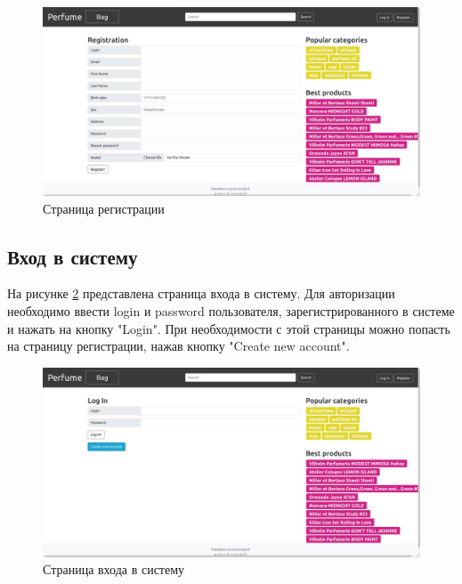 \captionsetup{singlelinecheck = false, justification=centering}
\begin{figure}[h!]
	\begin{center}
		\includegraphics[scale=0.45]{assets/site_reg.jpg}
	\end{center}
	\caption{Страница регистрации}
	\label{site_reg}
\end{figure}

\subsection{Вход в систему}

На рисунке \ref{site_login} представлена страница входа в систему. Для авторизации необходимо ввести login и password пользователя, зарегистрированного в системе и нажать на кнопку "Login". При необходимости с этой страницы можно попасть на страницу регистрации, нажав кнопку "Create new account".

\captionsetup{singlelinecheck = false, justification=centering}
\begin{figure}[h!]
	\begin{center}
		\includegraphics[scale=0.45]{assets/site_login.jpg}
	\end{center}
	\caption{Страница входа в систему}
	\label{site_login}
\end{figure}

